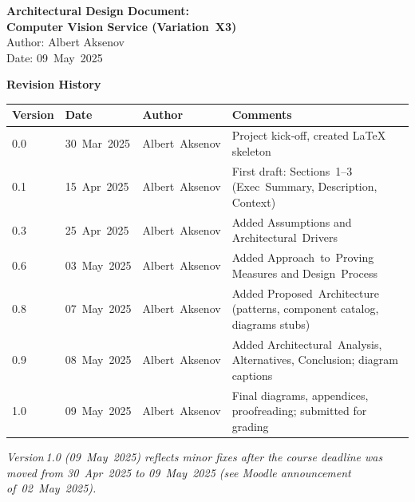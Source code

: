 \documentclass[11pt,a4paper]{article}
\newcommand{\AuthorName}{Albert Aksenov}
\newcommand{\DocumentTitle}{Architectural Design Document:\\Computer Vision Service (Variation X3)}
\newcommand{\DocDate}{09 May 2025}
\begin{document}
\begin{center}
  {\LARGE \textbf{\DocumentTitle}}\\[1.5em]
  {\large Author: \AuthorName}\\
  {\large Date: \DocDate}
\end{center}
\vspace{1.5em}

\noindent\textbf{Revision History}

\begin{center}
\begin{tabular}{|m{1.8cm}|m{2.8cm}|m{3cm}|m{6.4cm}|}
\hline
\textbf{Version} & \textbf{Date} & \textbf{Author} & \textbf{Comments} \\ \hline
0.0 & 30 Mar 2025 & Albert Aksenov & Project kick‑off, created LaTeX skeleton \\ \hline
0.1 & 15 Apr 2025 & Albert Aksenov & First draft: Sections 1–3 (Exec Summary, Description, Context) \\ \hline
0.3 & 25 Apr 2025 & Albert Aksenov & Added Assumptions and Architectural Drivers \\ \hline
0.6 & 03 May 2025 & Albert Aksenov & Added Approach to Proving Measures and Design Process \\ \hline
0.8 & 07 May 2025 & Albert Aksenov & Added Proposed Architecture (patterns, component catalog, diagrams stubs) \\ \hline
0.9 & 08 May 2025 & Albert Aksenov & Added Architectural Analysis, Alternatives, Conclusion; diagram captions \\ \hline
1.0 & 09 May 2025 & Albert Aksenov & Final diagrams, appendices, proofreading; submitted for grading \\ \hline
\end{tabular}
\noindent\textit{Version 1.0 (09 May 2025) reflects minor fixes after the course deadline was moved from 30 Apr 2025 to 09 May 2025 (see Moodle announcement of 02 May 2025).}
\end{center}

\vspace{2em}

\end{document}
